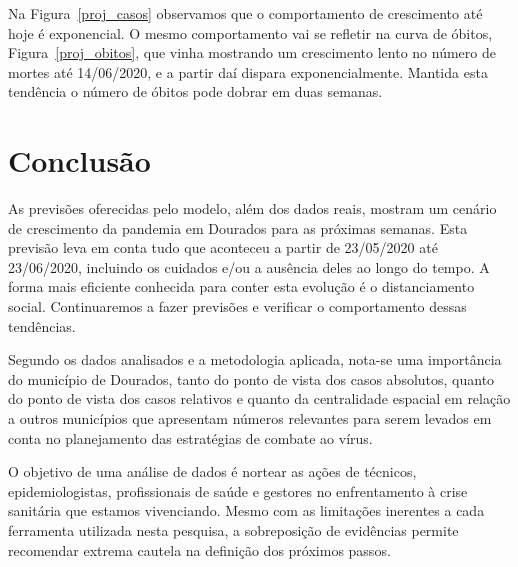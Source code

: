 \documentclass[12pt]{article}
\begin{document}
Na Figura~\ref{proj_casos} observamos que o comportamento de crescimento até hoje é exponencial. O mesmo comportamento vai se refletir na curva de óbitos, Figura~\ref{proj_obitos}, que vinha mostrando um crescimento lento no número de mortes até 14/06/2020, e a partir daí dispara exponencialmente. Mantida esta tendência o número de óbitos pode dobrar em duas semanas.   

\section{Conclusão}\label{conc}

As previsões oferecidas pelo modelo, além dos dados reais, mostram um cenário de crescimento da pandemia em Dourados para as próximas semanas. Esta previsão leva em conta tudo que aconteceu a partir de 23/05/2020 até 23/06/2020, incluindo os cuidados e/ou a ausência deles ao longo do tempo. A forma mais eficiente conhecida para conter esta evolução é o distanciamento social. Continuaremos a fazer previsões e verificar o comportamento dessas tendências.

Segundo os dados analisados e a metodologia aplicada, nota-se uma importância do município de Dourados, tanto do ponto de vista dos casos absolutos, quanto do ponto de vista dos casos relativos e quanto da centralidade espacial em relação a outros municípios que apresentam números relevantes para serem levados em conta no planejamento das estratégias de combate ao vírus.

O objetivo de uma análise de dados é nortear as ações de técnicos, epidemiologistas, profissionais de saúde e gestores no enfrentamento à crise sanitária que estamos vivenciando. Mesmo com as limitações inerentes a cada ferramenta utilizada nesta pesquisa, a sobreposição de evidências permite recomendar extrema cautela na definição dos próximos passos. 




\end{document}
